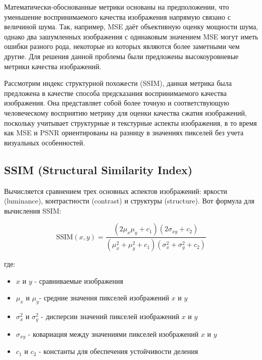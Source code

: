 
Математически-обоснованные метрики основаны на предположении, что уменьшение
воспринимаемого качества изображения напрямую связано с величиной шума. Так,
например, MSE даёт объективную оценку мощности шума, однако два зашумленных
изображения с одинаковым значением MSE могут иметь ошибки разного рода,
некоторые из которых являются более заметными чем другие. Для решения данной
проблемы были предложены высокоуровневые метрики качества изображений.



Рассмотрим индекс структурной похожести (SSIM), данная метрика была предложена в
качестве способа предсказания воспринимаемого качества изображения. Она
представляет собой более точную и соответствующую человеческому восприятию
метрику для оценки качества сжатия изображений, поскольку учитывает структурные
и текстурные аспекты изображения, в то время как MSE и PSNR ориентированы на
разницу в значениях пикселей без учета визуальных особенностей.


\subsection{SSIM (Structural Similarity Index)}

Вычисляется сравнением трех основных аспектов изображений: яркости (luminance),
контрастности (contrast) и структуры (structure). Вот формула для вычисления
SSIM:

\begin{equation} \label{eq:img_ssim}
    \text{SSIM}\left(x, y\right) = \frac{
        \left(2\mu_{x}\mu_{y} + c_{1}\right)\left(2\sigma_{xy} + c_{2}\right)
    }{
        \left(\mu_{x}^{2} + \mu_{y}^2 + c_{1}\right)\left(\sigma_{x}^{2} + \sigma_{y}^{2} + c_{2}\right)
    }
\end{equation}

\noindent где:

\begin{itemize}
    \item $x$ и $y$ - сравниваемые изображения
    \item $\mu_{x}$ и $\mu_{y}$​ - средние значения пикселей изображений $x$ и $y$
    \item $\sigma_{x}^{2}$ и $\sigma_{y}^{2}$ - дисперсии значений пикселей изображений $x$ и $y$
    \item $\sigma_{xy}$ - ковариация между значениями пикселей изображений $x$ и $y$
    \item $c_{1}$ и $c_{2}$ - константы для обеспечения устойчивости деления
\end{itemize}

